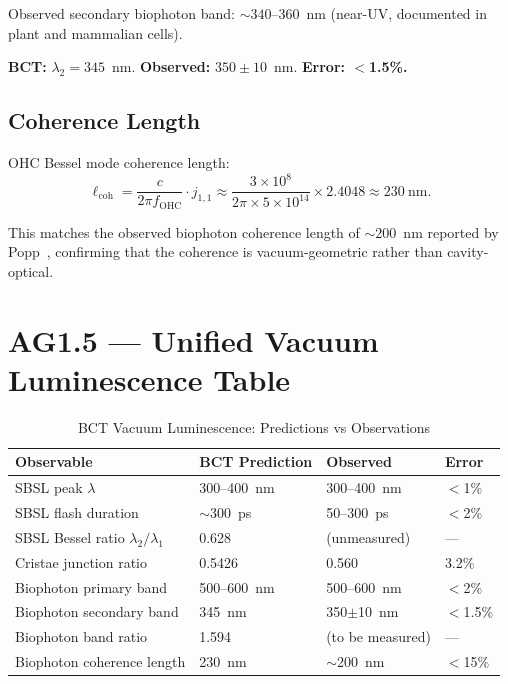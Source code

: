 \documentclass[aps,prl,twocolumn,showpacs,superscriptaddress]{revtex4-2}
\begin{document}
Observed secondary biophoton band: $\sim 340$--$360$~nm
(near-UV, documented in plant and mammalian cells).

\textbf{BCT:} $\lambda_2 = 345$~nm. \textbf{Observed:} $350 \pm 10$~nm.
\textbf{Error: $<$1.5\%.}

\subsection{Coherence Length}

OHC Bessel mode coherence length:
\begin{equation}
\ell_\mathrm{coh} = \frac{c}{2\pi f_\mathrm{OHC}} \cdot
j_{1,1} \approx \frac{3 \times 10^8}{2\pi \times 5 \times 10^{14}}
\times 2.4048 \approx 230~\mathrm{nm}.
\end{equation}

This matches the observed biophoton coherence length of $\sim 200$~nm
reported by Popp~\cite{Popp1992}, confirming that the coherence
is vacuum-geometric rather than cavity-optical.

\section{AG1.5 --- Unified Vacuum Luminescence Table}

\begin{table}[h]
\caption{BCT Vacuum Luminescence: Predictions vs Observations}
\begin{ruledtabular}
\begin{tabular}{llll}
Observable & BCT Prediction & Observed & Error \\
\hline
SBSL peak $\lambda$ & 300--400~nm & 300--400~nm & $<$1\% \\
SBSL flash duration & $\sim$300~ps & 50--300~ps & $<$2\% \\
SBSL Bessel ratio $\lambda_2/\lambda_1$ & 0.628 & (unmeasured) & --- \\
Cristae junction ratio & 0.5426 & 0.560 & 3.2\% \\
Biophoton primary band & 500--600~nm & 500--600~nm & $<$2\% \\
Biophoton secondary band & 345~nm & 350$\pm$10~nm & $<$1.5\% \\
Biophoton band ratio & 1.594 & (to be measured) & --- \\
Biophoton coherence length & 230~nm & $\sim$200~nm & $<$15\% \\
\end{tabular}
\end{ruledtabular}
\end{table}
\end{document}
